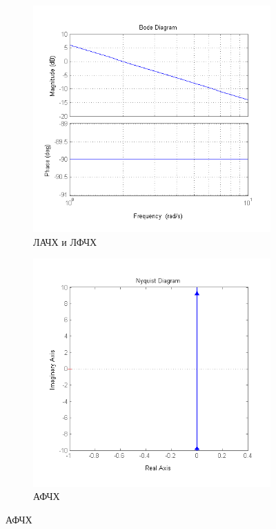 \documentclass[a4paper, 11pt, russian]{article}
\begin{document}
    \begin{figure}[ht!]
        \centering
        \begin{subfigure}[h]{0.44\textwidth}
            \includegraphics[width = \textwidth]{integratingLinkBode}
            \caption{ЛАЧХ и ЛФЧХ}
        \end{subfigure}
        \hfill
        \begin{subfigure}[h]{0.44\textwidth}
            \includegraphics[width = \textwidth]{integratingLinkNyquist}
            \caption{АФЧХ}
        \end{subfigure}
        

\end{figure}
\end{document}
